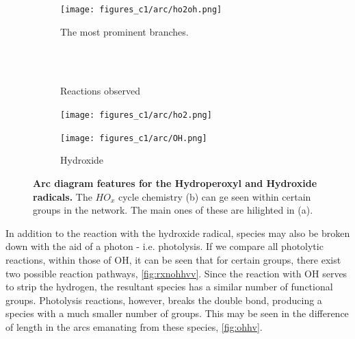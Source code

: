 \begin{figure}[H]
     \centering
      \begin{subfigure}[b]{.4\textwidth}
         \centering
         \texttt{[image: figures\_c1/arc/ho2oh.png]}
         \caption{The most prominent branches. }
         \label{fig:hv}
     \end{subfigure}
      \begin{subfigure}[b]{.4\textwidth}
         \centering
            \\ \ \\
    \hfill
         \caption{Reactions observed}
         \label{fig:rxnho2oh}
     \end{subfigure}
     \begin{subfigure}[b]{.4\textwidth}
         \centering
         \texttt{[image: figures\_c1/arc/ho2.png]}
         \caption{}
         \label{fig:hv}
     \end{subfigure}
     \begin{subfigure}[b]{.4\textwidth}
         \centering
         \texttt{[image: figures\_c1/arc/OH.png]}
         \caption{Hydroxide}
         \label{fig:oh}
     \end{subfigure}
      \caption{\textbf{ Arc diagram features for the Hydroperoxyl and Hydroxide radicals.} The $HO_x$ cycle chemistry (b) can ge seen within certain groups in the network. The main ones of these are hilighted in (a).   }
        \label{fig:ohho2}
\end{figure}


In addition to the reaction with the hydroxide radical, species may also be broken down with the aid of a photon - i.e. photolysis. If we compare all photolytic reactions, within those of OH, it can be seen that for certain groups, there exist two possible reaction pathways, \autoref{fig:rxnohhvv}. Since the reaction with OH serves to strip the hydrogen, the resultant species has a similar number of functional groups. Photolysis reactions, however, breaks the double bond, producing a species with a much smaller number of groups. This may be seen in the difference of length in the arcs emanating from these species, \autoref{fig:ohhv}. 




